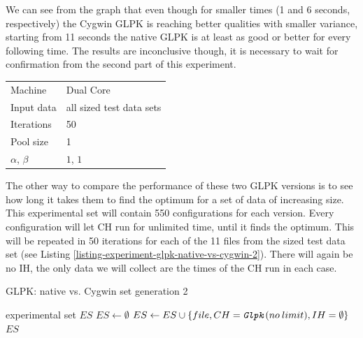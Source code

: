 We can see from the graph that even though for smaller times (1 and 6 seconds, respectively) the Cygwin GLPK is reaching better qualities with smaller variance, starting from 11 seconds the native GLPK is at least as good or better for every following time. The results are inconclusive though, it is necessary to wait for confirmation from the second part of this experiment.

\begin{center}
\bigskip
\begin{tabular}{| l | l |}
  \hline
  \hline
  Machine           & Dual Core \\
  Input data        & all sized test data sets \\
  Iterations        & 50 \\
  Pool size         & 1 \\
  $\alpha$, $\beta$ & $1$, $1$ \\
  \hline
\end{tabular}
\bigskip
\end{center}

The other way to compare the performance of these two GLPK versions is to see how long it takes them to find the optimum for a set of data of increasing size. This experimental set will contain 550 configurations for each version. Every configuration will let  CH run for unlimited time, until it finds the optimum. This will be repeated in 50 iterations for each of the 11 files from the sized test data set (see Listing \ref{listing-experiment-glpk-native-vs-cygwin-2}). There will again be no IH, the only data we will collect are the times of the CH run in each case.

\begin{algorithm}
\caption{GLPK: native vs. Cygwin set generation 2}
\label{listing-experiment-glpk-native-vs-cygwin-2}
\begin{algorithmic}
\ENSURE experimental set $ES$
\STATE $ES \gets \emptyset$
    \STATE $ES \gets ES \cup \{file, CH = \texttt{\textit{Glpk}}(no\:limit), IH = \emptyset\}$
  \ENDFOR
\ENDFOR
\RETURN $ES$
\end{algorithmic}
\end{algorithm}

